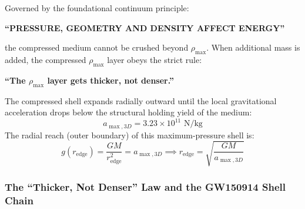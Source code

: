 \documentclass[11pt,a4paper]{article}
\begin{document}
Governed by the foundational continuum principle:
\begin{center}
\textbf{``PRESSURE, GEOMETRY AND DENSITY AFFECT ENERGY''}
\end{center}
the compressed medium cannot be crushed beyond $\rho_{\max}$. When additional mass is added, the compressed $\rho_{\max}$ layer obeys the strict rule:
\begin{center}
\textbf{``The $\rho_{\max}$ layer gets thicker, not denser.''}
\end{center}

The compressed shell expands radially outward until the local gravitational acceleration drops below the structural holding yield of the medium:
\begin{equation}
a_{\max,3D} = 3.23 \times 10^{11}\text{ N/kg}
\label{eq:a_max_3d}
\end{equation}
The radial reach (outer boundary) of this maximum-pressure shell is:
\begin{equation}
g(r_{\text{edge}}) = \frac{G M}{r_{\text{edge}}^2} = a_{\max,3D} \implies r_{\text{edge}} = \sqrt{\frac{G M}{a_{\max,3D}}}
\label{eq:r_edge_def}
\end{equation}

\subsubsection{The ``Thicker, Not Denser'' Law and the GW150914 Shell Chain}
\label{subsubsec:gw150914_shell_chain}
\end{document}
